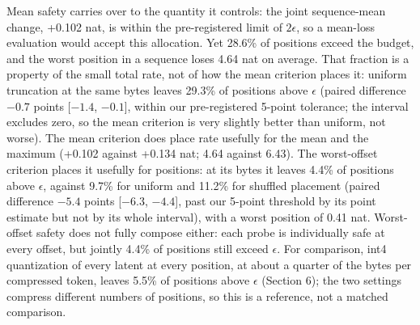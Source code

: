 \documentclass[11pt]{article}
\begin{document}
\begin{table}[t]
\centering
\caption{Joint truncation of all 32 probe positions per sequence (250M, 24 sequences, $\epsilon=0.10$ nat). "Own" uses each position's own safe rate; "uniform" and "shuffled" spend the same rate sum (uniform up to rounding). The maximum is the largest single-position loss change per sequence, averaged over sequences. Brackets: 95\% sequence-bootstrap intervals.}
\end{table}

Mean safety carries over to the quantity it controls: the joint sequence-mean change, +0.102 nat, is within the pre-registered limit of $2\epsilon$, so a mean-loss evaluation would accept this allocation. Yet 28.6\% of positions exceed the budget, and the worst position in a sequence loses 4.64 nat on average. That fraction is a property of the small total rate, not of how the mean criterion places it: uniform truncation at the same bytes leaves 29.3\% of positions above $\epsilon$ (paired difference $-0.7$ points [$-1.4$, $-0.1$], within our pre-registered 5-point tolerance; the interval excludes zero, so the mean criterion is very slightly better than uniform, not worse). The mean criterion does place rate usefully for the mean and the maximum (+0.102 against +0.134 nat; 4.64 against 6.43). The worst-offset criterion places it usefully for positions: at its bytes it leaves 4.4\% of positions above $\epsilon$, against 9.7\% for uniform and 11.2\% for shuffled placement (paired difference $-5.4$ points [$-6.3$, $-4.4$], past our 5-point threshold by its point estimate but not by its whole interval), with a worst position of 0.41 nat. Worst-offset safety does not fully compose either: each probe is individually safe at every offset, but jointly 4.4\% of positions still exceed $\epsilon$. For comparison, int4 quantization of every latent at every position, at about a quarter of the bytes per compressed token, leaves 5.5\% of positions above $\epsilon$ (Section 6); the two settings compress different numbers of positions, so this is a reference, not a matched comparison.
\end{document}
